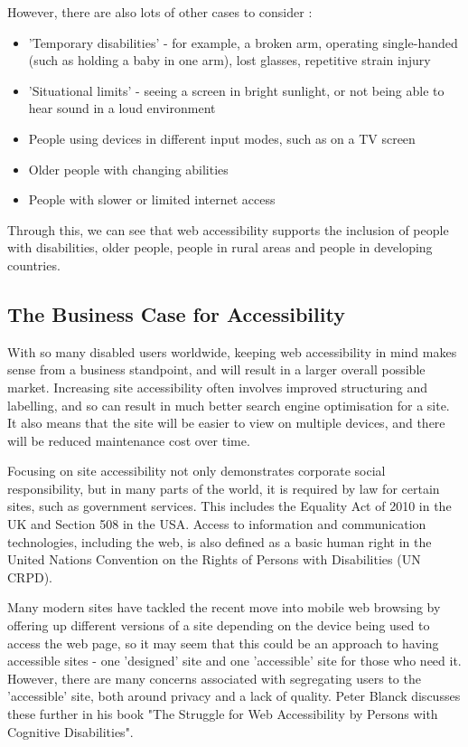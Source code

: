 \documentclass[ %
                    author={Aleena Baig},
                supervisor={Dr Simon Lock},
                    degree={BSc},
                     title={On Making Web Accessible Graphs},
                  subtitle={},
                      year={2019} ]{dissertation}
\begin{document}
However, there are also lots of other cases to consider :\cite{WAIaccessibilityintro}
%
\begin{itemize}
    \item 'Temporary disabilities' - for example, a broken arm, operating single-handed (such as holding a baby in one arm), lost glasses, repetitive strain injury
    \item 'Situational limits' - seeing a screen in bright sunlight, or not being able to hear sound in a loud environment
    \item People using devices in different input modes, such as on a TV screen
    \item Older people with changing abilities
    \item People with slower or limited internet access
\end{itemize}

Through this, we can see that web accessibility supports the inclusion of people with disabilities, older people, people in rural areas and people in developing countries.

\subsection{The Business Case for Accessibility}

With so many disabled users worldwide, keeping web accessibility in mind makes sense from a business standpoint, and will result in a larger overall possible market. Increasing site accessibility often involves improved structuring and labelling, and so can result in much better search engine optimisation for a site. It also means that the site will be easier to view on multiple devices, and there will be reduced maintenance cost over time.\cite{WAIaccessibilityintro}

Focusing on site accessibility not only demonstrates corporate social responsibility, but in many parts of the world, it is required by law for certain sites, such as government services. This includes the Equality Act of 2010 in the UK and Section 508 in the USA. Access to information and communication technologies, including the web, is also defined as a basic human right in the United Nations Convention on the Rights of Persons with Disabilities (UN CRPD).\cite{accessibilityUN}

Many modern sites have tackled the recent move into mobile web browsing by offering up different versions of a site depending on the device being used to access the web page, so it may seem that this could be an approach to having accessible sites - one 'designed' site and one 'accessible' site for those who need it. However, there are many concerns associated with segregating users to the 'accessible' site, both around privacy and a lack of quality. Peter Blanck discusses these further in his book "The Struggle for Web Accessibility by Persons with Cognitive Disabilities".\cite[p.~157]{strugglewebaccessibility}
\end{document}
